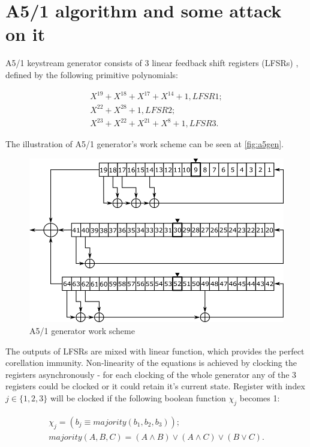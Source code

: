 \documentclass[runningheads,a4paper]{llncs}[2015/06/24]
\begin{document}
\section{A5/1 algorithm and some attack on it}\label{sec:alg}

A5/1 keystream generator consists of 3 linear feedback shift registers (LFSRs)
\cite{MENEZES}, defined by the following primitive polynomials:

\begin{gather*} 
	X^{19}+X^{18}+X^{17}+X^{14}+1, LFSR1;
	\\X^{22}+X^{28}+1, LFSR2;
	\\X^{23}+X^{22}+X^{21}+X^{8}+1, LFSR3.
\end{gather*}

The illustration of A5/1 generator's work scheme can be seen at
\cref{fig:a5gen}.

\begin{figure}
	\includegraphics[width=\linewidth]{./a51.png} 
	\caption{A5/1 generator work scheme} 
	\label{fig:a51gen} 
\end{figure}

The outputs of LFSRs are mixed with linear function, which provides the perfect
corellation immunity. Non-linearity of the equations is achieved by clocking
the registers asynchronously - for each clocking of the whole generator any of
the 3 registers could be clocked or it could retain it's current state.
Register with index $j \in \{1,2,3\}$ will be clocked if the following boolean
function $\chi_j$ becomes 1:

\begin {gather*}
\chi_j = (b_j \equiv majority(b_1,b_2,b_3)); 
\\majority(A,B,C)=(A \wedge B) \vee (A \wedge C) \vee (B \vee C).
\end{gather*}
\end{document}
